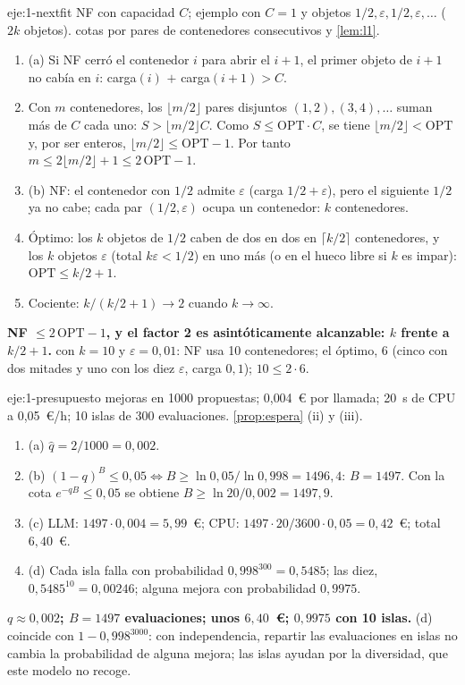\begin{solucion}{eje:1-nextfit}
\datos NF con capacidad $C$; ejemplo con $C=1$ y objetos $1/2,\varepsilon,1/2,\varepsilon,\dots$ ($2k$ objetos).
\planteamiento cotas por pares de contenedores consecutivos y \cref{lem:l1}.
\pasos
\begin{enumerate}[label=\arabic*.]
  \item (a) Si NF cerró el contenedor $i$ para abrir el $i+1$, el primer objeto de $i+1$ no cabía en $i$: carga$(i)$ $+$ carga$(i+1)>C$.
  \item Con $m$ contenedores, los $\lfloor m/2\rfloor$ pares disjuntos $(1,2),(3,4),\dots$ suman más de $C$ cada uno: $S>\lfloor m/2\rfloor C$. Como $S\le\mathrm{OPT}\cdot C$, se tiene $\lfloor m/2\rfloor<\mathrm{OPT}$ y, por ser enteros, $\lfloor m/2\rfloor\le\mathrm{OPT}-1$. Por tanto $m\le2\lfloor m/2\rfloor+1\le2\,\mathrm{OPT}-1$.
  \item (b) NF: el contenedor con $1/2$ admite $\varepsilon$ (carga $1/2+\varepsilon$), pero el siguiente $1/2$ ya no cabe; cada par $(1/2,\varepsilon)$ ocupa un contenedor: $k$ contenedores.
  \item Óptimo: los $k$ objetos de $1/2$ caben de dos en dos en $\lceil k/2\rceil$ contenedores, y los $k$ objetos $\varepsilon$ (total $k\varepsilon<1/2$) en uno más (o en el hueco libre si $k$ es impar): $\mathrm{OPT}\le k/2+1$.
  \item Cociente: $k/(k/2+1)\to 2$ cuando $k\to\infty$.
\end{enumerate}
\resultado \textbf{NF $\le 2\,\mathrm{OPT}-1$, y el factor 2 es asintóticamente alcanzable: $k$ frente a $k/2+1$.}
\comprobacion con $k=10$ y $\varepsilon=0{,}01$: NF usa 10 contenedores; el óptimo, 6 (cinco con dos mitades y uno con los diez $\varepsilon$, carga $0{,}1$); $10\le 2\cdot6$.
\end{solucion}

\begin{solucion}{eje:1-presupuesto}
 mejoras en 1000 propuestas; 0{,}004~€ por llamada; 20~s de CPU a 0{,}05~€/h; 10 islas de 300 evaluaciones.
\planteamiento \cref{prop:espera} (ii) y (iii).
\pasos
\begin{enumerate}[label=\arabic*.]
  \item (a) $\hat q=2/1000=0{,}002$.
  \item (b) $(1-q)^{B}\le0{,}05\iff B\ge\ln0{,}05/\ln0{,}998=1496{,}4$: $B=1497$. Con la cota $e^{-qB}\le0{,}05$ se obtiene $B\ge\ln20/0{,}002=1497{,}9$.
  \item (c) LLM: $1497\cdot0{,}004=5{,}99$~€; CPU: $1497\cdot20/3600\cdot0{,}05=0{,}42$~€; total $6{,}40$~€.
  \item (d) Cada isla falla con probabilidad $0{,}998^{300}=0{,}5485$; las diez, $0{,}5485^{10}=0{,}00246$; alguna mejora con probabilidad $0{,}9975$.
\end{enumerate}
\resultado \textbf{$q\approx0{,}002$; $B=1497$ evaluaciones; unos $6{,}40$~€; $0{,}9975$ con 10 islas.}
\comprobacion (d) coincide con $1-0{,}998^{3000}$: con independencia, repartir las evaluaciones en islas no cambia la probabilidad de alguna mejora; las islas ayudan por la diversidad, que este modelo no recoge.
\end{solucion}

